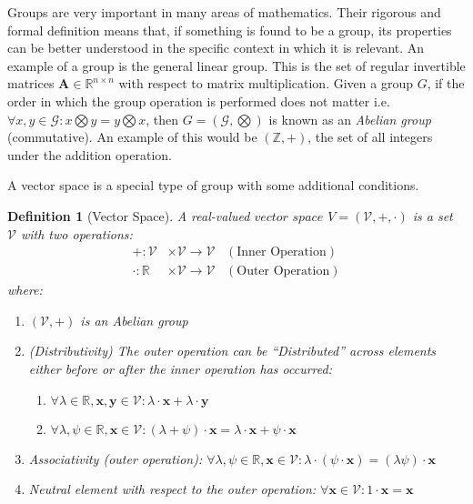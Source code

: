 \documentclass[a4paper,12pt]{book}
\newcommand{\set}[1]{\mathcal{#1}}
\newcommand{\operation}{\bigotimes}
\newcommand{\matrx}[1]{\bm{#1}}
\newcommand{\vectr}[1]{\textbf{#1}}
\newcommand{\real}{\mathbb{R}}
\newcommand{\integers}{\mathbb{Z}}
\newcommand{\italic}[1]{\textit{#1}}
\newtheorem{definition}{Definition}[section]
\begin{document}
	Groups are very important in many areas of mathematics. Their rigorous and formal definition means that, if something is found to be a group, its properties can be better understood in the specific context in which it is relevant.
	An example of a group is the general linear group. This is the set of regular invertible matrices $ \matrx{A} \in \real^{n \times n} $ with respect to matrix multiplication.
	Given a group $ G $, if the order in which the group operation is performed does not matter i.e. $ \forall x, y \in \set{G} : x \operation y = y \operation x $, then $ G = (\set{G}, \operation) $ is known as an \italic{Abelian group} (commutative). An example of this would be $ (\integers, +) $, the set of all integers under the addition operation.
	
	
	A vector space \cite{mml_vector_space_37} is a special type of group with some additional conditions. 
	
	\begin{definition}[Vector Space]
		\normalfont A real-valued $\italic{vector space}$ $V = (\set{V}, +, \cdot)$ is a set $\set{V}$ with two operations:
		\begin{align}
			+: \set{V} &\times \set{V} \rightarrow \set{V} \hspace{10pt} (\text{Inner Operation}) \\
			\cdot: \real &\times \set{V} \rightarrow \set{V} \hspace{10pt} (\text{Outer Operation})
		\end{align}
		where:
		\begin{enumerate}
			\item $(\set{V}, +)$ is an Abelian group
			\item (Distributivity) The outer operation can be ``Distributed'' across elements either before or after the inner operation has occurred: 
			\begin{enumerate}
				\item $\forall \lambda \in \real, \vectr{x}, \vectr{y} \in \mathcal{V}: \lambda \cdot \vectr{x} + \lambda \cdot \vectr{y}$
				\item $\forall \lambda, \psi \in \real, \vectr{x} \in \set{V}: (\lambda + \psi) \cdot \vectr{x} = \lambda \cdot \vectr{x} + \psi \cdot \vectr{x}$
			\end{enumerate} 
			\item Associativity (outer operation): $\forall \lambda, \psi \in \real, \vectr{x} \in \set{V}: \lambda \cdot (\psi \cdot \vectr{x}) = (\lambda \psi) \cdot \vectr{x}$
			\item Neutral element with respect to the outer operation: $\forall \vectr{x} \in \set{V}: 1 \cdot \vectr{x} = \vectr{x}$
		\end{enumerate}
	\end{definition}
	
\end{document}
